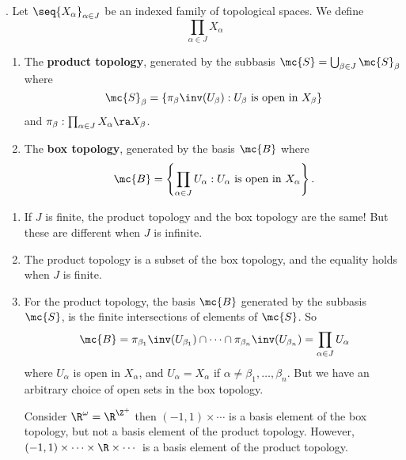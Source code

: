 . Let \(\seq{X_\alpha}_{\alpha \in J}\) be an indexed family of topological spaces. We define
\[
    \prod_{\alpha \in J} X_\alpha
\]
\begin{enumerate}
    \item The \textbf{product topology}, generated by the subbasis \(\mc{S} = \bigcup_{\beta \in J} \mc{S}_\beta\) where
          \[
              \mc{S}_\beta = \left\{ \pi_\beta\inv(U_\beta) : U_\beta \text{ is open in } X_\beta \right\}
          \]
          and \(\pi_\beta: \prod_{\alpha \in J} X_\alpha \ra X_\beta\).
    \item The \textbf{box topology}, generated by the basis \(\mc{B}\) where
          \[
              \mc{B} = \left\{\prod_{\alpha \in J} U_\alpha : U_\alpha \text{ is open in } X_\alpha\right\}.
          \]
\end{enumerate}

\rmk
\begin{enumerate}
    \item If \(J\) is finite, the product topology and the box topology are the same! But these are different when \(J\) is infinite.
    \item The product topology is a subset of the box topology, and the equality holds when \(J\) is finite.
    \item For the product topology, the basis \(\mc{B}\) generated by the subbasis \(\mc{S}\), is the finite intersections of elements of \(\mc{S}\). So
          \[
              \mc{B} = \pi_{\beta_1}\inv(U_{\beta_1}) \cap \cdots \cap \pi_{\beta_n}\inv(U_{\beta_n}) = \prod_{\alpha \in J} U_\alpha
          \]
          where \(U_\alpha\) is open in \(X_\alpha\), and \(U_\alpha = X_\alpha\) if \(\alpha \neq \beta_1, \dots, \beta_n\). But we have an arbitrary choice of open sets in the box topology.

          Consider \(\R^\omega = \R^{\Z^+}\) then \((-1, 1) \times \cdots\) is a basis element of the box topology, but not a basis element of the product topology. However, \((-1, 1) \times \cdots \times \R \times \cdots\) is a basis element of the product topology.
\end{enumerate}

\pagebreak
